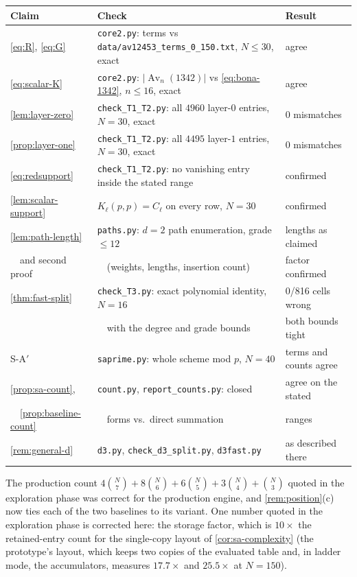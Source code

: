 \documentclass[11pt,reqno]{amsart}
\theoremstyle{definition}
\theoremstyle{remark}
\newcommand{\Av}{\operatorname{Av}}
\begin{document}
\begin{center}\footnotesize
\begin{tabular}{@{}p{}p{}p{}@{}}
\toprule
Claim & Check & Result\\
\midrule
\eqref{eq:R}, \eqref{eq:G} & \texttt{core2.py}: terms vs
 \texttt{data/av12453\_terms\_0\_150.txt}, $N\leq30$, exact & agree\\
\eqref{eq:scalar-K} & \texttt{core2.py}: $|\Av_n(1342)|$ vs
 \eqref{eq:bona-1342}, $n\leq16$, exact & agree\\
\cref{lem:layer-zero} & \texttt{check\_T1\_T2.py}: all $4960$ layer-$0$
 entries, $N=30$, exact & $0$ mismatches\\
\cref{prop:layer-one} & \texttt{check\_T1\_T2.py}: all $4495$ layer-$1$
 entries, $N=30$, exact & $0$ mismatches\\
\eqref{eq:redsupport} & \texttt{check\_T1\_T2.py}: no vanishing entry
 inside the stated range & confirmed\\
\cref{lem:scalar-support} & $K_\ell(p,p)=C_\ell$ on every row, $N=30$ &
 confirmed\\
\cref{lem:path-length} & \texttt{paths.py}: $d=2$ path enumeration,
 grade $\leq12$ & lengths as claimed\\
\ \ and second proof & \ \ (weights, lengths, insertion count) & factor
 confirmed\\
\cref{thm:fast-split} & \texttt{check\_T3.py}: exact polynomial identity,
 $N=16$ & $0$/816 cells wrong\\
 & \ \ with the degree and grade bounds & both bounds tight\\
S-A$'$ & \texttt{saprime.py}: whole scheme mod $p$, $N=40$ & terms and
 counts agree\\
\cref{prop:sa-count}, & \texttt{count.py}, \texttt{report\_counts.py}:
 closed & agree on the stated\\
\ \ \cref{prop:baseline-count} & \ \ forms vs.\ direct summation & ranges\\
\cref{rem:general-d} & \texttt{d3.py}, \texttt{check\_d3\_split.py},
 \texttt{d3fast.py} & as described there\\
\bottomrule
\end{tabular}
\end{center}

\noindent
The production count $4\binom N7+8\binom N6+6\binom N5+3\binom N4+\binom N3$
quoted in the exploration phase was correct for the production engine, and
\cref{rem:position}(c) now ties each of the two baselines to its variant.
One number quoted in the exploration phase is corrected here: the storage
factor, which is $10\times$ the retained-entry count for the single-copy layout of
\cref{cor:sa-complexity} (the prototype's layout, which keeps two copies of
the evaluated table and, in ladder mode, the accumulators, measures
$17.7\times$ and $25.5\times$ at $N=150$).
\end{document}

